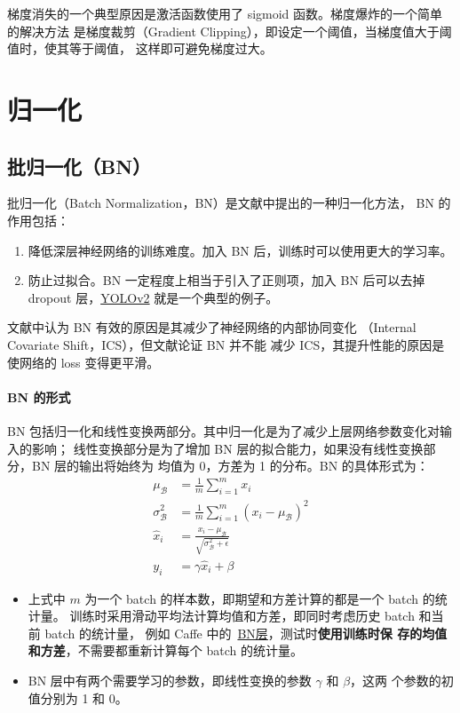 梯度消失的一个典型原因是激活函数使用了 sigmoid 函数。梯度爆炸的一个简单的解决方法
是梯度裁剪（Gradient Clipping），即设定一个阈值，当梯度值大于阈值时，使其等于阈值，
这样即可避免梯度过大。

\section{归一化}

\subsection{批归一化（BN）}
\label{sub:BN}

批归一化（Batch Normalization，BN）是文献中提出的一种归一化方法，
BN 的作用包括：

\begin{enumerate}
  \item 降低深层神经网络的训练难度。加入 BN 后，训练时可以使用更大的学习率。
  \item 防止过拟合。BN 一定程度上相当于引入了正则项，加入 BN 后可以去掉 dropout
    层，\hyperref[subsec:YOLOv2]{YOLOv2} 就是一个典型的例子。
\end{enumerate}

文献中认为 BN 有效的原因是其减少了神经网络的内部协同变化
（Internal Covariate Shift，ICS），但文献论证 BN 并不能
减少 ICS，其提升性能的原因是使网络的 loss 变得更平滑。

\paragraph{BN 的形式}
BN 包括归一化和线性变换两部分。其中归一化是为了减少上层网络参数变化对输入的影响；
线性变换部分是为了增加 BN 层的拟合能力，如果没有线性变换部分，BN 层的输出将始终为
均值为 0，方差为 1 的分布。BN 的具体形式为：
\begin{align}
  \label{equ:BN}
  \mu_{\mathcal{B}} & = \frac{1}{m} \sum_{i=1}^{m} x_i \\
  \sigma_{\mathcal{B}}^2 & = \frac{1}{m} \sum_{i=1}^{m} (x_i-\mu_{\mathcal{B}})^2 \\
  \hat{x}_i & = \frac{x_i - \mu_{\mathcal{B}}}{\sqrt{\sigma_{\mathcal{B}}^2 + \epsilon}} \\
  y_i & = \gamma \hat{x}_i + \beta
\end{align}

\begin{itemize}
\item 上式中 $m$ 为一个 batch 的样本数，即期望和方差计算的都是一个 batch 的统计量。
  训练时采用滑动平均法计算均值和方差，即同时考虑历史 batch 和当前 batch 的统计量，
  例如 Caffe 中的~\href{https://bit.ly/2JBY7aw}{BN层}，测试时\textbf{使用训练时保
    存的均值和方差}，不需要都重新计算每个 batch 的统计量。
  \item BN 层中有两个需要学习的参数，即线性变换的参数 $\gamma$ 和 $\beta$，这两
    个参数的初值分别为 1 和 0。
\end{itemize}

